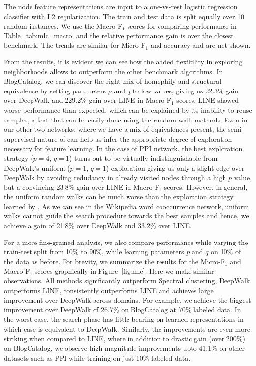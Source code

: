 The node feature representations are input to a one-vs-rest logistic regression classifier with L2 regularization. The train and test data is split equally over 10 random instances. We use the Macro-F$_1$ scores for comparing performance in Table~\ref{tab:mlc_macro} and the relative performance gain is over the closest benchmark. The trends are similar for Micro-F$_1$ and accuracy and are not shown. 

From the results, it is evident we can see how the added flexibility in exploring neighborhoods allows \nodevec to outperform the other benchmark algorithms. In BlogCatalog, we can discover the right mix of homophily and structural equivalence by setting parameters $p$ and $q$ to low values, giving us 22.3\% gain over DeepWalk and 229.2\% gain over LINE in Macro-F$_1$ scores. LINE showed worse performance than expected, which can be explained by its inability to reuse samples, a feat that can be easily done using the random walk methods. Even in our other two networks, where we have a mix of equivalences present, the semi-supervised nature of \nodevec can help us infer the appropriate degree of exploration necessary for feature learning. In the case of PPI network, the best exploration strategy ($p=4$, $q=1$) turns out to be virtually indistinguishable from DeepWalk's uniform ($p=1$, $q=1$) exploration giving us only a slight edge over DeepWalk by avoiding redudancy in already visited nodes through a high $p$ value, but a convincing 23.8\% gain over LINE in Macro-F$_1$ scores. However, in general, the uniform random walks can be much worse than the exploration strategy learned by \nodevec. As we can see in the Wikipedia word cooccurrence network, uniform walks cannot guide the search procedure towards the best samples and hence, we achieve a gain of 21.8\% over DeepWalk and 33.2\% over LINE.%

For a more fine-grained analysis, we also compare performance while varying the train-test split from 10\% to 90\%, while learning parameters $p$ and $q$ on 10\% of the data as before. For brevity, we summarize the results for the Micro-F$_1$ and Macro-F$_1$ scores graphically in Figure~\ref{fig:mlc}. Here we make similar observations. All methods significantly outperform Spectral clustering, DeepWalk outperforms LINE, \nodevec consistently outperforms LINE and achieves large improvement over DeepWalk across domains. For example, we achieve the biggest improvement over DeepWalk of 26.7\% on BlogCatalog at 70\% labeled data. In the worst case, the search phase has little bearing on learned representations in which case \nodevec is equivalent to DeepWalk. Similarly, the improvements are even more striking when compared to LINE, where in addition to drastic gain (over 200\%) on BlogCatalog, we observe high magnitude improvements upto 41.1\% on other datasets such as PPI while training on just 10\% labeled data.

